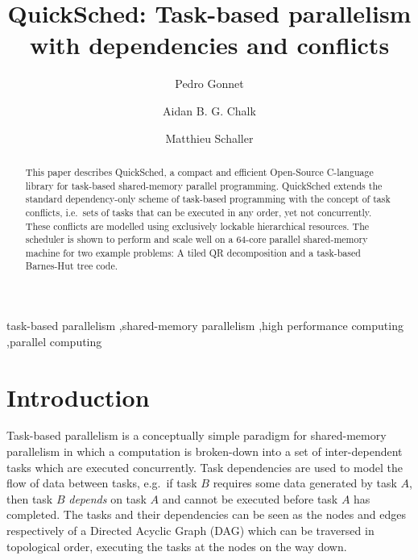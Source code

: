 \documentclass[preprint]{elsarticle}
\begin{document}
\title{QuickSched: Task-based parallelism with dependencies and conflicts}
\author[ecs,ggl]{Pedro Gonnet} 
\author[ecs]{Aidan B. G. Chalk} 
\author[icc]{Matthieu Schaller} 
\address[ecs]{School of Engineering and Computing Sciences, Durham University, South Road, Durham DH1 3LE, United Kingdom}
\address[icc]{Institute for Computational Cosmology, Durham University, South Road, Durham DH1 3LE, United Kingdom}
\address[ggl]{Google Switzerland GmbH, Brandshenkestr. 110, 8002 Z\"urich, Switzerland}

\begin{abstract}
This paper describes QuickSched, a compact and efficient Open-Source
C-language library for task-based shared-memory parallel programming.
QuickSched extends the standard dependency-only scheme of task-based
programming with the concept of task conflicts, i.e.~sets of tasks
that can be executed in any order, yet not concurrently.
These conflicts are modelled using exclusively lockable
hierarchical resources.
The scheduler is shown to perform and scale well on a 64-core parallel
shared-memory machine for two example problems: A tiled QR
decomposition and a task-based Barnes-Hut tree code.
\end{abstract}

\begin{keyword}
    task-based parallelism \sep shared-memory parallelism \sep high performance computing \sep parallel computing
\end{keyword}

\maketitle


\section{Introduction}

Task-based parallelism is a conceptually simple paradigm for
shared-memory parallelism in which a computation is broken-down
into a set of inter-dependent tasks which are executed
concurrently.
Task dependencies are used to model the flow of data between
tasks, e.g.~if task $B$ requires some data generated by task $A$,
then task $B$ {\em depends} on task $A$ and cannot be executed
before task $A$ has completed.
The tasks and their dependencies can be seen as the nodes and edges
respectively of a Directed Acyclic Graph (DAG) which can be
traversed in topological order, executing the tasks at the nodes
on the way down.
\end{document}
